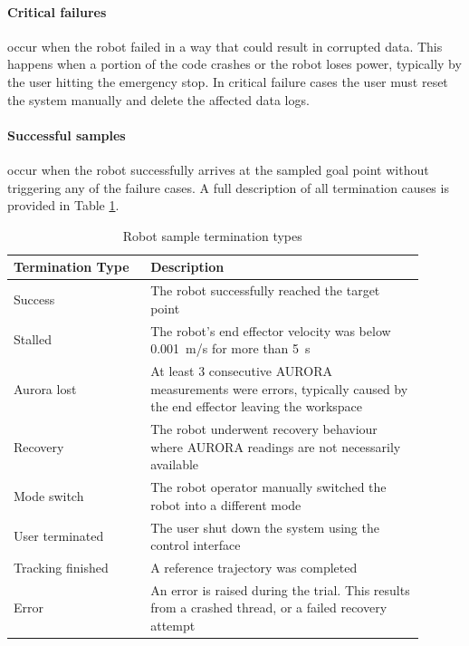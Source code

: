 \paragraph{Critical failures} occur when the robot failed in a way that could result in corrupted data. This happens when a portion of the code crashes or the robot loses power, typically by the user hitting the emergency stop. In critical failure cases the user must reset the system manually and delete the affected data logs. 

\paragraph{Successful samples} occur when the robot successfully arrives at the sampled goal point without triggering any of the failure cases. A full description of all termination causes is provided in Table \ref{tab:termination_types}. 

\begin{table}[h]
    \centering   
    \caption{Robot sample termination types}
    \begin{tabular}{p{0.3\linewidth} | p{0.6\linewidth}}
        \textbf{Termination Type} & \textbf{Description} \\
        \hline
        Success & The robot successfully reached the target point \\\hline
        Stalled & The robot's end effector velocity was below \SI{0.001}{m/s} for more than \SI{5}{s} \\\hline
        Aurora lost & At least 3 consecutive AURORA measurements were errors, typically caused by the end effector leaving the workspace \\\hline
        Recovery & The robot underwent recovery behaviour where AURORA readings are not necessarily available \\\hline
        Mode switch & The robot operator manually switched the robot into a different mode \\\hline
        User terminated & The user shut down the system using the control interface \\\hline
        Tracking finished & A reference trajectory was completed \\\hline
        Error & An error is raised during the trial. This results from a crashed thread, or a failed recovery attempt \\\hline

    \end{tabular}
    \label{tab:termination_types}
\end{table}